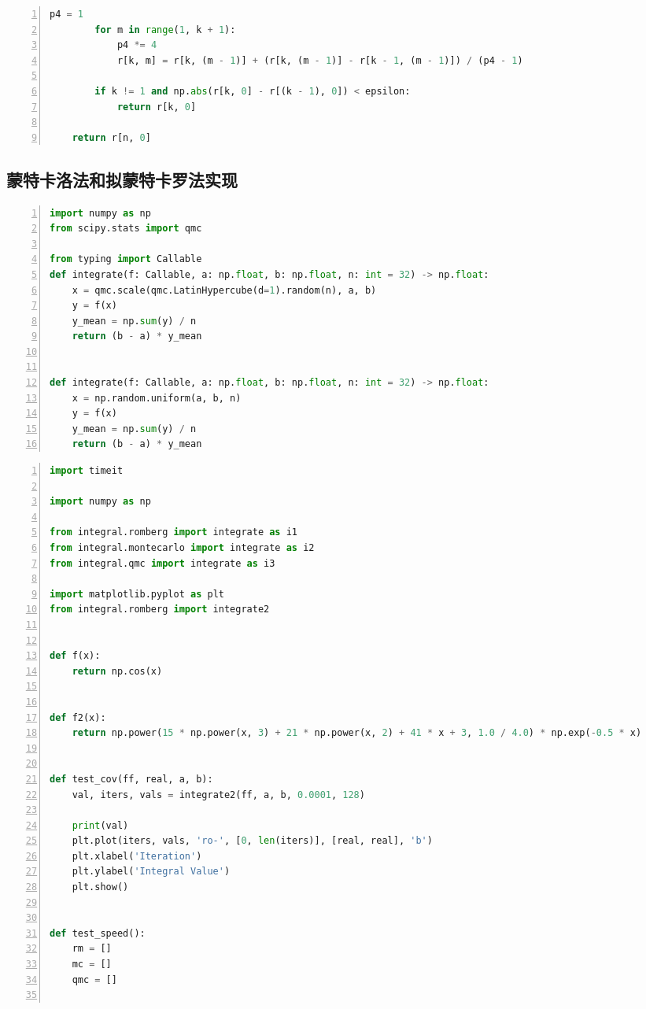 \documentclass[a4paper,twoside]{article}
\begin{document}
\begin{spacing}{1.2}
\begin{lstlisting}[language=Python,numbers=left,style=PythonStyle,label={code:romberg},caption=龙贝格积分实现]
        p4 = 1
        for m in range(1, k + 1):
            p4 *= 4
            r[k, m] = r[k, (m - 1)] + (r[k, (m - 1)] - r[k - 1, (m - 1)]) / (p4 - 1)

        if k != 1 and np.abs(r[k, 0] - r[(k - 1), 0]) < epsilon:
            return r[k, 0]

    return r[n, 0]
\end{lstlisting}

\subsection{蒙特卡洛法和拟蒙特卡罗法实现}
\begin{lstlisting}[language=Python,numbers=left,style=PythonStyle,label={code:romberg},caption=龙贝格积分实现]
import numpy as np
from scipy.stats import qmc
	
from typing import Callable
def integrate(f: Callable, a: np.float, b: np.float, n: int = 32) -> np.float:
    x = qmc.scale(qmc.LatinHypercube(d=1).random(n), a, b)
    y = f(x)
    y_mean = np.sum(y) / n
    return (b - a) * y_mean


def integrate(f: Callable, a: np.float, b: np.float, n: int = 32) -> np.float:
    x = np.random.uniform(a, b, n)
    y = f(x)
    y_mean = np.sum(y) / n
    return (b - a) * y_mean

\end{lstlisting}

\begin{lstlisting}[language=Python,numbers=left,style=PythonStyle,label={code:romberg},caption=基准测试代码]
import timeit

import numpy as np

from integral.romberg import integrate as i1
from integral.montecarlo import integrate as i2
from integral.qmc import integrate as i3

import matplotlib.pyplot as plt
from integral.romberg import integrate2


def f(x):
    return np.cos(x)


def f2(x):
    return np.power(15 * np.power(x, 3) + 21 * np.power(x, 2) + 41 * x + 3, 1.0 / 4.0) * np.exp(-0.5 * x)


def test_cov(ff, real, a, b):
    val, iters, vals = integrate2(ff, a, b, 0.0001, 128)

    print(val)
    plt.plot(iters, vals, 'ro-', [0, len(iters)], [real, real], 'b')
    plt.xlabel('Iteration')
    plt.ylabel('Integral Value')
    plt.show()


def test_speed():
    rm = []
    mc = []
    qmc = []


\end{lstlisting}
\end{spacing}
\end{document}
